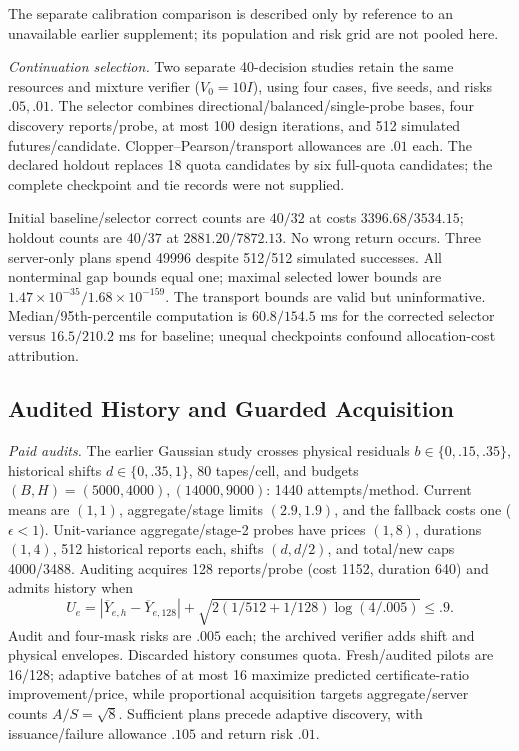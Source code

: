 The separate calibration comparison is described only by reference to an unavailable earlier supplement; its population and risk grid are not pooled here.

\label{app:controller-diagnostics}
\emph{Continuation selection.} Two separate 40-decision studies retain the same resources and mixture verifier ($V_0=10I$), using four cases, five seeds, and risks $.05,.01$. The selector combines directional/balanced/single-probe bases, four discovery reports/probe, at most 100 design iterations, and 512 simulated futures/candidate. Clopper--Pearson/transport allowances are $.01$ each. The declared holdout replaces 18 quota candidates by six full-quota candidates; the complete checkpoint and tie records were not supplied.

Initial baseline/selector correct counts are $40/32$ at costs $3396.68/3534.15$; holdout counts are $40/37$ at $2881.20/7872.13$. No wrong return occurs. Three server-only plans spend 49996 despite 512/512 simulated successes. All nonterminal gap bounds equal one; maximal selected lower bounds are $1.47\times10^{-35}/1.68\times10^{-159}$. The transport bounds are valid but uninformative. Median/95th-percentile computation is $60.8/154.5$ ms for the corrected selector versus $16.5/210.2$ ms for baseline; unequal checkpoints confound allocation-cost attribution.

\subsection{Audited History and Guarded Acquisition}
\label{app:validity-study}
\emph{Paid audits.} The earlier Gaussian study crosses physical residuals $b\in\{0,.15,.35\}$, historical shifts $d\in\{0,.35,1\}$, 80 tapes/cell, and budgets $(B,H)=(5000,4000),(14000,9000)$: 1440 attempts/method. Current means are $(1,1)$, aggregate/stage limits $(2.9,1.9)$, and the fallback costs one ($\epsilon<1$). Unit-variance aggregate/stage-2 probes have prices $(1,8)$, durations $(1,4)$, 512 historical reports each, shifts $(d,d/2)$, and total/new caps 4000/3488. Auditing acquires 128 reports/probe (cost 1152, duration 640) and admits history when
$$U_e=|\overline Y_{e,h}-\overline Y_{e,128}|+
\sqrt{2(1/512+1/128)\log(4/.005)}\leq.9.$$
Audit and four-mask risks are $.005$ each; the archived verifier adds shift and physical envelopes. Discarded history consumes quota. Fresh/audited pilots are 16/128; adaptive batches of at most 16 maximize predicted certificate-ratio improvement/price, while proportional acquisition targets aggregate/server counts $A/S=\sqrt8$. Sufficient plans precede adaptive discovery, with issuance/failure allowance $.105$ and return risk $.01$.

